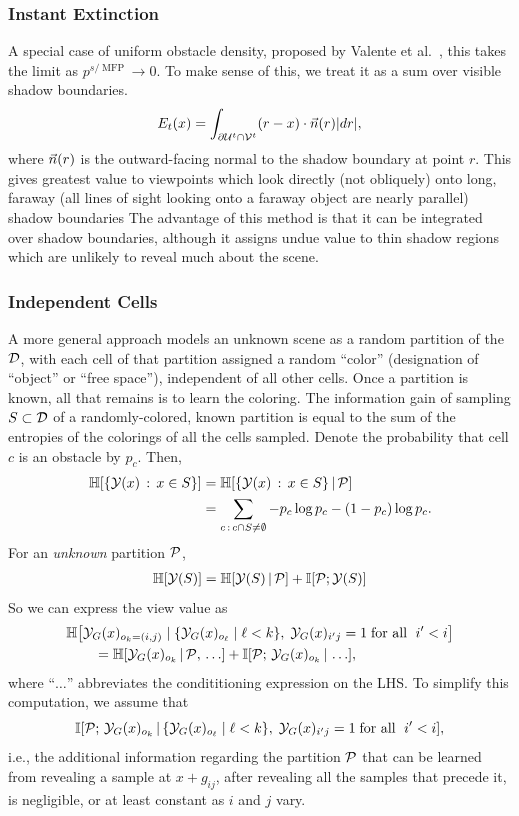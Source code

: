 \subsubsection{Instant Extinction}
A special case of uniform obstacle density, proposed by Valente et al.\ \cite{valenteTS13},
this takes the limit as $p^{s/\operatorname{MFP}}\to0$.
To make sense of this, we treat it as a sum over visible shadow boundaries.
$$E_t(x) = \int_{\del \U^t \cap \V^t} (r-x)\cdot \n(r) |dr|,$$
where $\n(r)$ is the outward-facing normal to the shadow boundary at point $r$.
This gives greatest value to viewpoints which look directly (not obliquely) onto long,
faraway (all lines of sight looking onto a faraway object are nearly parallel) shadow boundaries
The advantage of this method is that it can be integrated over shadow boundaries,
although it assigns undue value to thin shadow regions which are unlikely to reveal much about the scene.

\subsubsection{Independent Cells} \label{section: indcells}
A more general approach models an unknown scene as a 
random partition of the $\D$, with each cell of that partition assigned a random ``color''
(designation of ``object'' or ``free space''), independent of all other cells.
Once a partition is known, all that remains is to learn the coloring. 
The information gain of sampling $S\subs\D$ of a randomly-colored, known partition 
is equal to the sum of the entropies of the
colorings of all the cells sampled.
Denote the probability that cell $c$ is an obstacle by $p_c$.  Then,
\begin{align*}
\HH[\{\Y(x)\,:\,x\in S\}] &= \HH[\{\Y(x)\,:\,x\in S\}\,|\,\P]\\
&= \sum_{c\,:\,c\cap S\neq\emptyset} -p_c\log p_c - (1-p_c)\log p_c.
\end{align*}
For an \emph{unknown} partition $\P$, %
\begin{align}
\HH[\Y(S)] = \HH[\Y(S)\,|\,\P]  + \II[\P;\Y(S)]
\end{align}
So we can express the view value as
\begin{align*}
&\HH\bigl[\Y_G(x)_{o_k=(i,j)}\;|\;
\{\Y_G(x)_{o_{\ell}}\;|\;\ell<k\},\;
\Y_G(x)_{i\1j}=1\;\text{for all $\;i\1<i$}
\bigr]\\
&\qquad = \HH[\Y_G(x)_{o_k}\,|\,\P,\,\ldots] + \II[\P;\,\Y_G(x)_{o_k}\,|\,\ldots],
\end{align*}
where ``$\ldots$'' abbreviates the condititioning expression on the LHS.
To simplify this computation, we assume that
$$\II[\P;\,\Y_G(x)_{o_k}\,|\,\{\Y_G(x)_{o_{\ell}}\;|\;\ell<k\},\;
\Y_G(x)_{i\1j}=1\;\text{for all $\;i\1<i$}],$$
i.e., the additional information regarding the partition $\P$
that can be learned from revealing a sample at $x+g_{ij}$,
after revealing all the samples that precede it,
is negligible, or at least constant as $i$ and $j$ vary.

